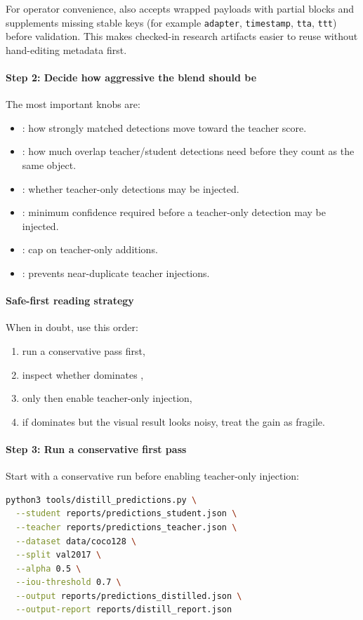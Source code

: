 For operator convenience,  also accepts wrapped payloads with partial  blocks and supplements missing stable keys (for example \texttt{adapter}, \texttt{timestamp}, \texttt{tta}, \texttt{ttt}) before validation. This makes checked-in research artifacts easier to reuse without hand-editing metadata first.

\paragraph{Step 2: Decide how aggressive the blend should be}
The most important knobs are:
\begin{itemize}
  \item {}: how strongly matched detections move toward the teacher score.
  \item {}: how much overlap teacher/student detections need before they count as the same object.
  \item {}: whether teacher-only detections may be injected.
  \item {}: minimum confidence required before a teacher-only detection may be injected.
  \item {}: cap on teacher-only additions.
  \item {}: prevents near-duplicate teacher injections.
\end{itemize}

\paragraph{Safe-first reading strategy}
When in doubt, use this order:
\begin{enumerate}
  \item run a conservative pass first,
  \item inspect whether  dominates ,
  \item only then enable teacher-only injection,
  \item if  dominates but the visual result looks noisy, treat the gain as fragile.
\end{enumerate}

\paragraph{Step 3: Run a conservative first pass}
Start with a conservative run before enabling teacher-only injection:
\begin{lstlisting}[language=bash]
python3 tools/distill_predictions.py \
  --student reports/predictions_student.json \
  --teacher reports/predictions_teacher.json \
  --dataset data/coco128 \
  --split val2017 \
  --alpha 0.5 \
  --iou-threshold 0.7 \
  --output reports/predictions_distilled.json \
  --output-report reports/distill_report.json
\end{lstlisting}

